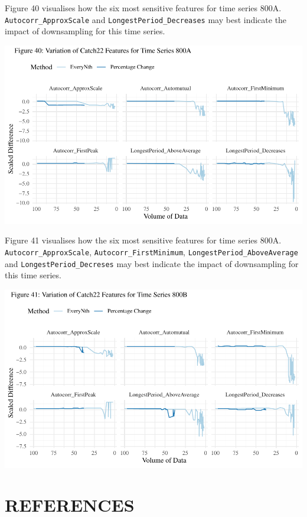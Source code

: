 \documentclass{article}
\begin{document}
\newpage

Figure 40 visualises how the six most sensitive features for time series
800A. \texttt{Autocorr\_ApproxScale} and
\texttt{LongestPeriod\_Decreases} may best indicate the impact of
downsampling for this time series.

\includegraphics{210431461_CSC8639_Dissertation_files/figure-latex/Catch22Variation800A-1.pdf}

Figure 41 visualises how the six most sensitive features for time series
800A. \texttt{Autocorr\_ApproxScale}, \texttt{Autocorr\_FirstMinimum},
\texttt{LongestPeriod\_AboveAverage} and
\texttt{LongestPeriod\_Decreses} may best indicate the impact of
downsampling for this time series.

\includegraphics{210431461_CSC8639_Dissertation_files/figure-latex/Catch22Variation800B-1.pdf}

\newpage

\hypertarget{references}{%
\section*{REFERENCES}\label{references}}
\end{document}
